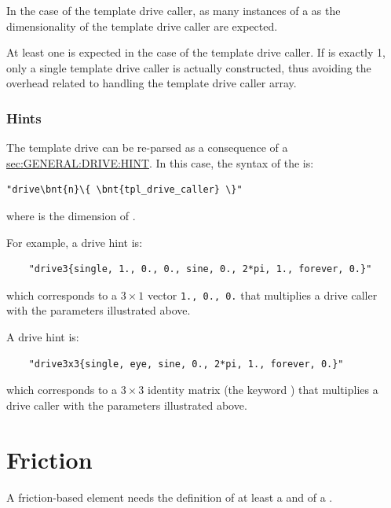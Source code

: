In the case of the  template drive caller,
as many instances of a  as the dimensionality
of the template drive caller are expected.

At least one  is expected in the case of the 
template drive caller. 
If  is exactly 1, only a single
template drive caller is actually constructed, thus avoiding the overhead 
related to handling the template drive caller array.    

\subsubsection{Hints}
The template drive can be re-parsed as a consequence of a
\hyperref{\kw{hint}}{\kw{hint} (see Section~}{)}{sec:GENERAL:DRIVE:HINT}.
In this case, the syntax of the  is:
\begin{Verbatim}[commandchars=\\\{\}]
    "drive\bnt{n}\{ \bnt{tpl_drive_caller} \}"
\end{Verbatim}
where  is the dimension of .

For example, a  drive hint is:
\begin{verbatim}
    "drive3{single, 1., 0., 0., sine, 0., 2*pi, 1., forever, 0.}"
\end{verbatim}
which corresponds to a $3 \times 1$ vector \texttt{1., 0., 0.} that multiplies
a  drive caller with the parameters illustrated above.

A  drive hint is:
\begin{verbatim}
    "drive3x3{single, eye, sine, 0., 2*pi, 1., forever, 0.}"
\end{verbatim}
which corresponds to a $3 \times 3$ identity matrix (the keyword ) that multiplies
a  drive caller with the parameters illustrated above.







\section{Friction}
\label{sec:friction model}
A friction-based element needs the definition of
at least a  and of a .

